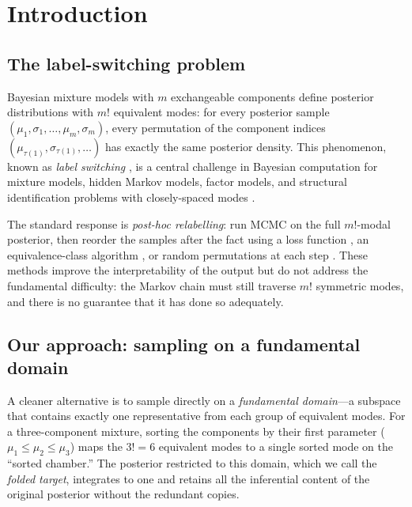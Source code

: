 \section{Introduction}
\label{sec:introduction}

\subsection{The label-switching problem}

Bayesian mixture models with $m$ exchangeable components define
posterior distributions with $m!$ equivalent modes: for every
posterior sample $(\mu_1, \sigma_1, \ldots, \mu_m, \sigma_m)$,
every permutation of the component indices
$(\mu_{\tau(1)}, \sigma_{\tau(1)}, \ldots)$ has exactly the
same posterior density.  This phenomenon, known as
\emph{label switching} \citep{Stephens2000,Jasra2005,Celeux2000},
is a central challenge in Bayesian computation for mixture models,
hidden Markov models, factor models, and structural identification
problems with closely-spaced modes
\citep{Au2011,YangLamBeck2019}.

The standard response is \emph{post-hoc relabelling}: run MCMC
on the full $m!$-modal posterior, then reorder the samples after
the fact using a loss function \citep{Stephens2000}, an
equivalence-class algorithm \citep{Papastamoulis2010}, or random
permutations at each step \citep{FruhwirthSchnatter2001}.
These methods improve the interpretability of the output
but do not address the fundamental difficulty: the Markov chain
must still traverse $m!$ symmetric modes, and there is no
guarantee that it has done so adequately.

\subsection{Our approach: sampling on a fundamental domain}

A cleaner alternative is to sample directly on a
\emph{fundamental domain}---a subspace that contains exactly
one representative from each group of equivalent modes.
For a three-component mixture, sorting the components by their
first parameter ($\mu_1 \leq \mu_2 \leq \mu_3$) maps the
$3! = 6$ equivalent modes to a single sorted mode on the
``sorted chamber.''  The posterior restricted to this domain,
which we call the \emph{folded target}, integrates to one
and retains all the inferential content of the original posterior
without the redundant copies.

